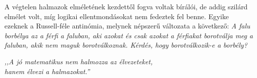 \documentclass[a4paper,12pt]{article}
\begin{document}
	\bigskip
	A végtelen halmazok elméletének kezdettől fogva voltak bírálói, de addig
	szilárd elmélet volt, míg logikai ellentmondásokat nem fedeztek fel benne.
	Egyike ezeknek a Russell-féle antinómia, melynek népszerű változata a következő: \emph{A falu borbélya az a férfi a faluban, aki azokat és csak azokat a
		férfiakat borotválja meg a faluban, akik nem maguk borotválkoznak. Kérdés,
		hogy borotválkozik-e a borbély?}
	
	\begin{flushright}
	{\footnotesize 	\emph{,,A jó matematikus nem halmozza az élvezeteket,\\
	hanem élvezi a halmazokat.''}}
	\end{flushright}
\end{document}
